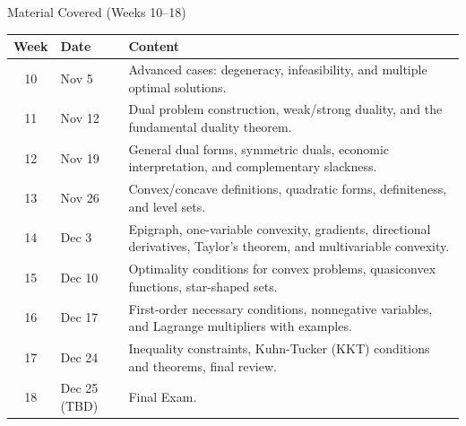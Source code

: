 \documentclass[aspectratio=169,hyperref,UTF8,CJK]{beamer}
\begin{document}
\begin{frame}{Material Covered (Weeks 10--18)}
  \scriptsize
  \begin{tabularx}{\textwidth}{@{}c l X@{}}
    \toprule
    Week & Date & Content \\
    \midrule
    10 & Nov 5 & Advanced cases: degeneracy, infeasibility, and multiple optimal solutions. \\
    11 & Nov 12 & Dual problem construction, weak/strong duality, and the fundamental duality theorem. \\
    12 & Nov 19 & General dual forms, symmetric duals, economic interpretation, and complementary slackness. \\
    13 & Nov 26 & Convex/concave definitions, quadratic forms, definiteness, and level sets. \\
    14 & Dec 3 & Epigraph, one-variable convexity, gradients, directional derivatives, Taylor's theorem, and multivariable convexity. \\
    15 & Dec 10 & Optimality conditions for convex problems, quasiconvex functions, star-shaped sets. \\
    16 & Dec 17 & First-order necessary conditions, nonnegative variables, and Lagrange multipliers with examples. \\
    17 & Dec 24 & Inequality constraints, Kuhn-Tucker (KKT) conditions and theorems, final review. \\
    18 & Dec 25 (TBD) & Final Exam. \\
    \bottomrule
  \end{tabularx}
\end{frame}
\end{document}
